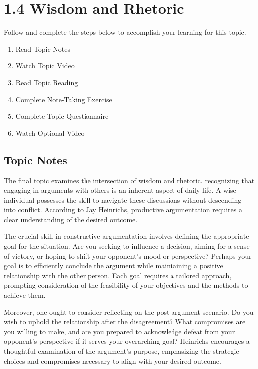 \documentclass[
]{book}
\providecommand{\tightlist}{%
  \setlength{\itemsep}{0pt}\setlength{\parskip}{0pt}}
\begin{document}
\hypertarget{wisdom-and-rhetoric}{%
\section*{1.4 Wisdom and Rhetoric}\label{wisdom-and-rhetoric}}

Follow and complete the steps below to accomplish your learning for this topic.

\begin{enumerate}
\def\labelenumi{\arabic{enumi}.}
\tightlist
\item
  Read Topic Notes
\item
  Watch Topic Video
\item
  Read Topic Reading
\item
  Complete Note-Taking Exercise
\item
  Complete Topic Questionnaire
\item
  Watch Optional Video
\end{enumerate}

\hypertarget{topic-notes-3}{%
\subsection*{Topic Notes}\label{topic-notes-3}}

The final topic examines the intersection of wisdom and rhetoric, recognizing that engaging in arguments with others is an inherent aspect of daily life. A wise individual possesses the skill to navigate these discussions without descending into conflict. According to Jay Heinrichs, productive argumentation requires a clear understanding of the desired outcome.

The crucial skill in constructive argumentation involves defining the appropriate goal for the situation. Are you seeking to influence a decision, aiming for a sense of victory, or hoping to shift your opponent's mood or perspective? Perhaps your goal is to efficiently conclude the argument while maintaining a positive relationship with the other person. Each goal requires a tailored approach, prompting consideration of the feasibility of your objectives and the methods to achieve them.

Moreover, one ought to consider reflecting on the post-argument scenario. Do you wish to uphold the relationship after the disagreement? What compromises are you willing to make, and are you prepared to acknowledge defeat from your opponent's perspective if it serves your overarching goal? Heinrichs encourages a thoughtful examination of the argument's purpose, emphasizing the strategic choices and compromises necessary to align with your desired outcome.
\end{document}
